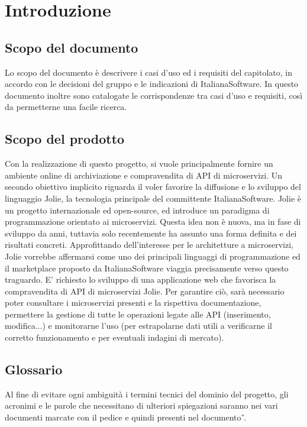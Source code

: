\newpage
\section{Introduzione}

\subsection{Scopo del documento}
Lo scopo del documento è descrivere i casi d'uso ed i requisiti del capitolato, in accordo con le decisioni del gruppo e le indicazioni di ItalianaSoftware. In questo documento inoltre sono catalogate le corrispondenze tra casi d'uso e requisiti, così da permetterne una facile ricerca.
\subsection{Scopo del prodotto}
Con la realizzazione di questo progetto, si vuole principalmente fornire un ambiente online di archiviazione e compravendita di API di microservizi. Un secondo obiettivo implicito riguarda il voler favorire la diffusione e lo sviluppo del linguaggio Jolie, la tecnologia principale del committente ItalianaSoftware. Jolie è un progetto internazionale ed open-source, ed introduce un paradigma di programmazione orientato ai microservizi. Questa idea non è nuova, ma in fase di sviluppo da anni, tuttavia solo recentemente ha assunto una forma definita e dei risultati concreti. Approfittando dell'interesse per le architetture a microservizi, Jolie vorrebbe affermarsi come uno dei principali linguaggi di programmazione ed il marketplace proposto da ItalianaSoftware viaggia precisamente verso questo traguardo. E' richiesto lo sviluppo di una applicazione web che favorisca la compravendita di API di microservizi Jolie. Per garantire ciò, sarà necessario poter consultare i microservizi presenti e la rispettiva documentazione, permettere la gestione di tutte le operazioni legate alle API (inserimento, modifica...) e monitorarne l'uso (per estrapolarne dati utili a verificarne il corretto funzionamento e per eventuali indagini di mercato).

\subsection{Glossario}
Al fine di evitare ogni ambiguità i termini tecnici del dominio del progetto, gli acronimi e le parole che necessitano di ulteriori spiegazioni saranno nei vari documenti marcate con il pedice  e quindi presenti nel documento \textit{\G}.

